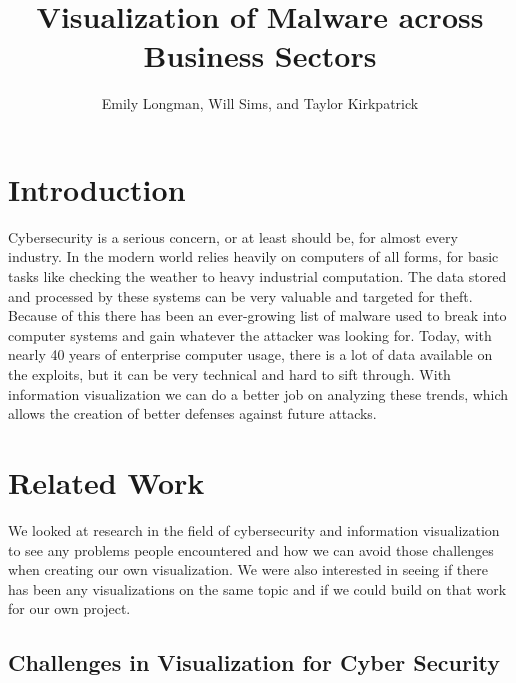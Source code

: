 \documentclass[journal]{vgtc}                %
\title{Visualization of Malware across Business Sectors}
\author{Emily Longman, Will Sims, and Taylor Kirkpatrick}
\begin{document}


\maketitle

\section{Introduction} %
Cybersecurity is a serious concern, or at least should be, for almost every industry.
In the modern world relies heavily on computers of all forms, for basic tasks like checking the weather to heavy industrial computation.
The data stored and processed by these systems can be very valuable and targeted for theft.
Because of this there has been an ever-growing list of malware used to break into computer systems and gain whatever the attacker was looking for.
Today, with nearly 40 years of enterprise computer usage, there is a lot of data available on the exploits, but it can be very technical and hard to sift through. 
With information visualization we can do a better job on analyzing these trends, which allows the creation of better defenses against future attacks.

\section{Related Work}

We looked at research in the field of cybersecurity and information visualization to see any problems people encountered and how we can avoid those challenges when creating our own visualization. 
We were also interested in seeing if there has been any visualizations on the same topic and if we could build on that work for our own project. 

\subsection{Challenges in Visualization for Cyber Security}
\end{document}
